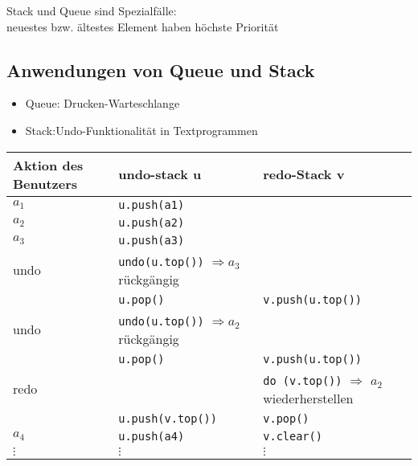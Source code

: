        Stack und Queue sind Spezialfälle: \\
        neuestes bzw. ältestes Element haben höchste Priorität \\


        \subsection*{Anwendungen von Queue und Stack}
        \begin{itemize}
            \item Queue: Drucken-Warteschlange
            \item Stack:Undo-Funktionalität in Textprogrammen
        \end{itemize}

        \begin{tabular}{C{5cm} | C{5cm} | C{5cm}}
            Aktion des Benutzers & undo-stack u & redo-Stack v \\ \hline
            $a_1$ & \verb|u.push(a1)| & \\
            $a_2$ & \verb|u.push(a2)| & \\
            $a_3$ & \verb|u.push(a3)| & \\ \hline
            undo & \verb|undo(u.top())| $\Rightarrow a_3$ rückgängig & \\
            & \verb|u.pop()| & \verb|v.push(u.top())|\\ \hline
            undo & \verb|undo(u.top())| $\Rightarrow a_2$ rückgängig & \\
            & \verb|u.pop()| & \verb|v.push(u.top())|\\ \hline
            redo & & \verb|do (v.top())| $\Rightarrow$ $a_2$ wiederherstellen \\
            & \verb|u.push(v.top())| & \verb|v.pop()| \\ \hline
            $a_4$ & \verb|u.push(a4)| & \verb|v.clear()| \\
            $\vdots$ & $\vdots$ & $\vdots$ \\
        \end{tabular}


